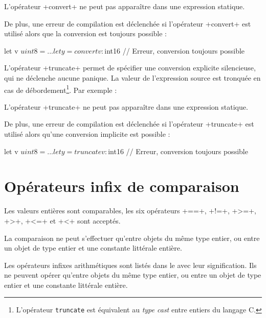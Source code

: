 L'opérateur \plm+convert+ ne peut pas apparaître dans une expression statique.

De plus, une erreur de compilation est déclenchée si l'opérateur \plm+convert+ est utilisé alors que la conversion est toujours possible :
\begin{PLM}
let v $uint8 = ...
let y = convert v : $int16 // Erreur, conversion toujours possible
\end{PLM}


L'opérateur \plm+truncate+ permet de spécifier une conversion explicite silencieuse, qui ne déclenche aucune panique. La valeur de l'expression source est tronquée en cas de débordement\footnote{L'opérateur \texttt{truncate} est équivalent au \emph{type cast} entre entiers du langage C.}. Par exemple :


L'opérateur \plm+truncate+ ne peut pas apparaître dans une expression statique.

De plus, une erreur de compilation est déclenchée si l'opérateur \plm+truncate+ est utilisé alors qu'une conversion implicite est possible :
\begin{PLM}
let v $uint8 = ...
let y =truncate v : $int16 // Erreur, conversion toujours possible
\end{PLM}

\section{Opérateurs infix de comparaison}

Les valeurs entières sont comparables, les six opérateurs \plm+==+, \plm+!=+, \plm+>=+, \plm+>+, \plm+<=+ et \plm+<+ sont acceptés.

La comparaison ne peut s'effectuer qu'entre objets du même type entier, ou entre un objet de type entier et une constante littérale entière.











Les opérateurs infixes arithmétiques sont listés dans le  avec leur signification. Ils ne peuvent opérer qu'entre objets du même type entier, ou entre un objet de type entier et une constante littérale entière.


